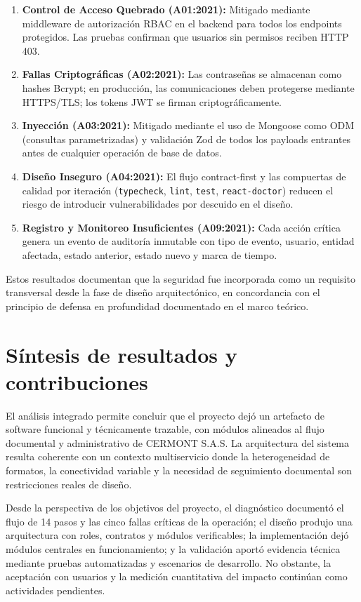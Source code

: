 \begin{enumerate}
    \item \textbf{Control de Acceso Quebrado (A01:2021):} Mitigado mediante middleware de autorización RBAC en el backend para todos los endpoints protegidos. Las pruebas confirman que usuarios sin permisos reciben HTTP 403.
    \item \textbf{Fallas Criptográficas (A02:2021):} Las contraseñas se almacenan como hashes Bcrypt; en producción, las comunicaciones deben protegerse mediante HTTPS/TLS; los tokens JWT se firman criptográficamente.
    \item \textbf{Inyección (A03:2021):} Mitigado mediante el uso de Mongoose como ODM (consultas parametrizadas) y validación Zod de todos los payloads entrantes antes de cualquier operación de base de datos.
    \item \textbf{Diseño Inseguro (A04:2021):} El flujo contract-first y las compuertas de calidad por iteración (\texttt{typecheck}, \texttt{lint}, \texttt{test}, \texttt{react-doctor}) reducen el riesgo de introducir vulnerabilidades por descuido en el diseño.
    \item \textbf{Registro y Monitoreo Insuficientes (A09:2021):} Cada acción crítica genera un evento de auditoría inmutable con tipo de evento, usuario, entidad afectada, estado anterior, estado nuevo y marca de tiempo.
\end{enumerate}

Estos resultados documentan que la seguridad fue incorporada como un requisito transversal desde la fase de diseño arquitectónico, en concordancia con el principio de defensa en profundidad documentado en el marco teórico.

\section{Síntesis de resultados y contribuciones}
\label{sec:sintesis-resultados-final}

El análisis integrado permite concluir que el proyecto dejó un artefacto de software funcional y técnicamente trazable, con módulos alineados al flujo documental y administrativo de CERMONT S.A.S. La arquitectura del sistema resulta coherente con un contexto multiservicio donde la heterogeneidad de formatos, la conectividad variable y la necesidad de seguimiento documental son restricciones reales de diseño.

Desde la perspectiva de los objetivos del proyecto, el diagnóstico documentó el flujo de 14 pasos y las cinco fallas críticas de la operación; el diseño produjo una arquitectura con roles, contratos y módulos verificables; la implementación dejó módulos centrales en funcionamiento; y la validación aportó evidencia técnica mediante pruebas automatizadas y escenarios de desarrollo. No obstante, la aceptación con usuarios y la medición cuantitativa del impacto continúan como actividades pendientes.

